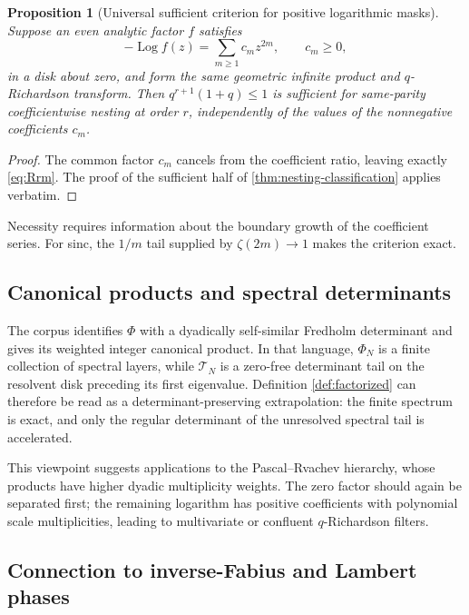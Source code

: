 \documentclass[11pt,oneside]{article}
\numberwithin{equation}{section}
\theoremstyle{frontier}
\newtheorem{proposition}[theorem]{Proposition}
\theoremstyle{definition}
\theoremstyle{remark}
\newcommand{\Log}{\operatorname{Log}}
\begin{document}
\begin{proposition}[Universal sufficient criterion for positive logarithmic masks]
\label{prop:universal-mask}
Suppose an even analytic factor $f$ satisfies
\[
 -\Log f(z)=\sum_{m\ge1}c_mz^{2m},\qquad c_m\ge0,
\]
in a disk about zero, and form the same geometric infinite product and $q$-Richardson
transform.  Then $q^{r+1}(1+q)\le1$ is sufficient for same-parity coefficientwise nesting at
order $r$, independently of the values of the nonnegative coefficients $c_m$.
\end{proposition}

\begin{proof}
The common factor $c_m$ cancels from the coefficient ratio, leaving exactly
\eqref{eq:Rrm}.  The proof of the sufficient half of
\cref{thm:nesting-classification} applies verbatim.
\end{proof}

Necessity requires information about the boundary growth of the coefficient series.  For
sinc, the $1/m$ tail supplied by $\zeta(2m)\to1$ makes the criterion exact.

\subsection{Canonical products and spectral determinants}

The corpus identifies $\Phi$ with a dyadically self-similar Fredholm determinant and gives
its weighted integer canonical product.  In that language, $\Phi_N$ is a finite collection
of spectral layers, while $\mathcal T_N$ is a zero-free determinant tail on the resolvent
disk preceding its first eigenvalue.  Definition \ref{def:factorized} can therefore be read
as a determinant-preserving extrapolation: the finite spectrum is exact, and only the
regular determinant of the unresolved spectral tail is accelerated.

This viewpoint suggests applications to the Pascal--Rvachev hierarchy, whose products have
higher dyadic multiplicity weights.  The zero factor should again be separated first; the
remaining logarithm has positive coefficients with polynomial scale multiplicities, leading
to multivariate or confluent $q$-Richardson filters.

\subsection{Connection to inverse-Fabius and Lambert phases}
\end{document}
